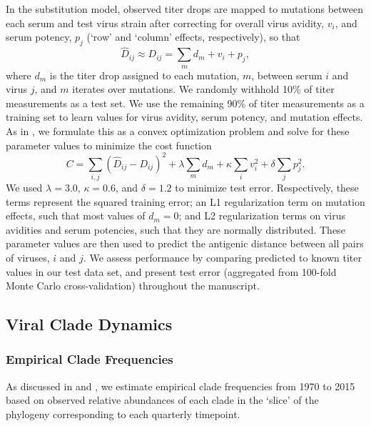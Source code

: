 \documentclass[11pt,oneside,letterpaper]{article}
\begin{document}
In the substitution model, observed titer drops are mapped to mutations between each serum and test virus strain after correcting for overall virus avidity, $v_i$, and serum potency, $p_j$ (`row' and `column' effects, respectively), so that
\begin{equation}
  \label{eq_predicted_titers}
\hat{D}_{ij} \approx D_{ij} = \sum_{m} d_m + v_i + p_j,
\end{equation}
where $d_m$ is the titer drop assigned to each mutation, $m$, between serum $i$ and virus $j$, and $m$ iterates over mutations.
We randomly withhold 10\% of titer measurements as a test set.
We use the remaining 90\% of titer measurements as a training set to learn values for virus avidity, serum potency, and mutation effects.
As in \citet{neher2016prediction}, we formulate this as a convex optimization problem and solve for these parameter values to minimize the cost function
\begin{equation}
  \label{eq_cost_fn}
C = \sum_{i,j} (\hat{D}_{ij} - D_{ij})^2 + \lambda \sum_{m} d_m + \kappa \sum_{i} v_i^2 + \delta \sum_{j} p_j^2.
\end{equation}
We used $\lambda = 3.0$, $\kappa = 0.6$, and $\delta = 1.2$ to minimize test error.
Respectively, these terms represent the squared training error; an L1 regularization term on mutation effects, such that most values of $d_m = 0$; and L2 regularization terms on virus avidities and serum potencies, such that they are normally distributed.
These parameter values are then used to predict the antigenic distance between all pairs of viruses, $i$ and $j$.
We assess performance by comparing predicted to known titer values in our test data set, and present test error (aggregated from 100-fold Monte Carlo cross-validation) throughout the manuscript.

\subsection*{Viral Clade Dynamics}
\subsubsection*{Empirical Clade Frequencies}
As discussed in \citet{neher2016prediction} and \citet{lee2018deep}, we estimate empirical clade frequencies from 1970 to 2015 based on observed relative abundances of each clade in the `slice' of the phylogeny corresponding to each quarterly timepoint.
\end{document}
